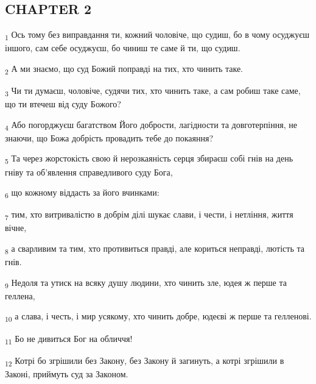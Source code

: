 \subsection{CHAPTER 2}
\begin{tcolorbox}
\textsubscript{1} Ось тому без виправдання ти, кожний чоловіче, що судиш, бо в чому осуджуєш іншого, сам себе осуджуєш, бо чиниш те саме й ти, що судиш.
\end{tcolorbox}
\begin{tcolorbox}
\textsubscript{2} А ми знаємо, що суд Божий поправді на тих, хто чинить таке.
\end{tcolorbox}
\begin{tcolorbox}
\textsubscript{3} Чи ти думаєш, чоловіче, судячи тих, хто чинить таке, а сам робиш таке саме, що ти втечеш від суду Божого?
\end{tcolorbox}
\begin{tcolorbox}
\textsubscript{4} Або погорджуєш багатством Його добрости, лагідности та довготерпіння, не знаючи, що Божа добрість провадить тебе до покаяння?
\end{tcolorbox}
\begin{tcolorbox}
\textsubscript{5} Та через жорстокість свою й нерозкаяність серця збираєш собі гнів на день гніву та об'явлення справедливого суду Бога,
\end{tcolorbox}
\begin{tcolorbox}
\textsubscript{6} що кожному віддасть за його вчинками:
\end{tcolorbox}
\begin{tcolorbox}
\textsubscript{7} тим, хто витривалістю в добрім ділі шукає слави, і чести, і нетління, життя вічне,
\end{tcolorbox}
\begin{tcolorbox}
\textsubscript{8} а сварливим та тим, хто противиться правді, але кориться неправді, лютість та гнів.
\end{tcolorbox}
\begin{tcolorbox}
\textsubscript{9} Недоля та утиск на всяку душу людини, хто чинить зле, юдея ж перше та геллена,
\end{tcolorbox}
\begin{tcolorbox}
\textsubscript{10} а слава, і честь, і мир усякому, хто чинить добре, юдеєві ж перше та гелленові.
\end{tcolorbox}
\begin{tcolorbox}
\textsubscript{11} Бо не дивиться Бог на обличчя!
\end{tcolorbox}
\begin{tcolorbox}
\textsubscript{12} Котрі бо згрішили без Закону, без Закону й загинуть, а котрі згрішили в Законі, приймуть суд за Законом.
\end{tcolorbox}
